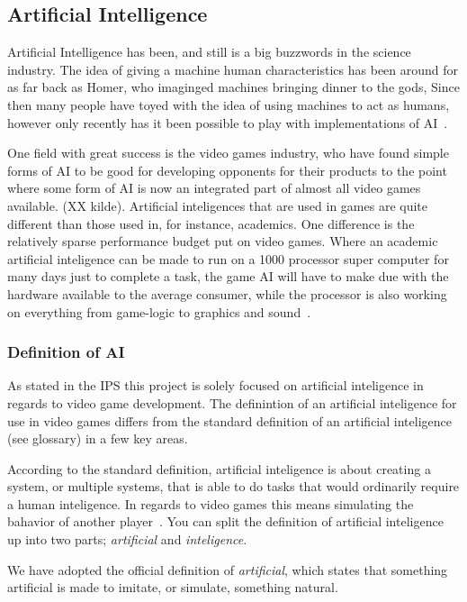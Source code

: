 

\subsection{Artificial Intelligence} \label{sec:ai}
Artificial Intelligence has been, and still is a big buzzwords in the science industry.
The idea of giving a machine human characteristics has been around for as far back as Homer, who imaginged machines bringing dinner to the gods, Since then many people have toyed with the idea of using machines to act as humans, however only recently has it been possible to play with implementations of AI~\autocite{Buchanan2006}.

One field with great success is the video games industry, who have found simple forms of AI to be good for developing opponents for their products to the point where some form of AI is now an integrated part of almost all video games available. (XX kilde).
Artificial inteligences that are used in games are quite different than those used in, for instance, academics.
One difference is the relatively sparse performance budget put on video games.
Where an academic artificial inteligence can be made to run on a 1000 processor super computer for many days just to complete a task, the game AI will have to make due with the hardware available to the average consumer, while the processor is also working on everything from game-logic to graphics and sound~\autocite{Buckland2005}.

\subsubsection{Definition of AI}
As stated in the IPS this project is solely focused on artificial inteligence in regards to video game development.
The definintion of an artificial inteligence for use in video games differs from the standard definition of an artificial inteligence (see glossary) in a few key areas.

According to the standard definition, artificial inteligence is about creating a system, or multiple systems, that is able to do tasks that would ordinarily require a human inteligence. In regards to video games this means simulating the bahavior of another player~\autocite{Kehoe2009}.
You can split the definition of artificial inteligence up into two parts; \emph{artificial} and \emph{inteligence}.

We have adopted the official definition of \emph{artificial}\autocite{artificial2014}, which states that something artificial is made to imitate, or simulate, something natural.

